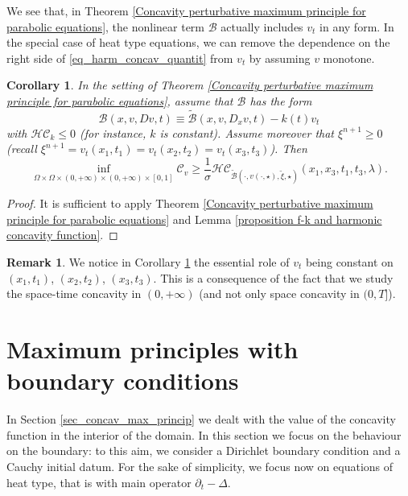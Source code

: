 \documentclass[11pt, reqno]{amsart}
\newtheorem{corollary}[lemma]{Corollary}
\theoremstyle{definition}
\newtheorem{remark}[lemma]{Remark}
\numberwithin{equation}{section}
\newcommand{\Btilde}{\widetilde{\mathscr{B}}}
\newcommand{\mc}[1]{\mathcal{#1}}
\begin{document}
We see that, in Theorem \ref{Concavity perturbative maximum principle for parabolic equations}, the nonlinear term $\mathscr{B}$ actually includes $v_t$ 
in any form. In the special case of heat type equations, we can remove the dependence on the right side of \eqref{eq_harm_concav_quantit} from $ v_t$ by assuming $v$ monotone.
\begin{corollary}\label{cor_discard_vt}
In the setting of Theorem \ref{Concavity perturbative maximum principle for parabolic equations}, assume that $\mathscr{B}$ has the form
$$\mathscr{B}(x, v, Dv, t) \equiv \Btilde(x,v, D_x v, t) - k(t) v_t$$
with $\mc{HC}_{k} \leq 0$ (for instance, $k$ is constant). 
Assume moreover that $\xi^{n+1} \geq 0$ (recall $\xi^{n+1}= v_t(x_1,t_1)= v_t(x_2,t_2)= v_t(x_3,t_3)$). Then
		\[ \inf_{\Omega\times \Omega \times (0,+\infty)\times (0,+\infty)\times[0,1]}\mathcal{C}_v\geq \dfrac{1}{\sigma} \mathcal{HC}_{\Btilde(\cdot, v(\cdot,\star), \tilde{\xi},\star)}(x_1,x_3,t_1,t_3,\lambda). \]
\end{corollary}
\begin{proof}
It is sufficient to apply Theorem \ref{Concavity perturbative maximum principle for parabolic equations} and Lemma \ref{proposition f-k and harmonic concavity function}.
\end{proof}

\begin{remark}
We notice in Corollary \ref{cor_discard_vt} the essential role of $ v_t$ being constant on $(x_1,t_1)$, $(x_2,t_2)$, $(x_3,t_3)$. This is a consequence of the fact that we study the space-time concavity in $(0,+\infty)$ (and not only space concavity in $(0,T]$).
\end{remark}


\section{Maximum principles with boundary conditions}
\label{sec_gen_eigen}

In Section \ref{sec_concav_max_princip} we dealt with the value of the concavity function in the interior of the domain. In this section we focus on the behaviour on the boundary: to this aim, we consider a Dirichlet boundary condition and a Cauchy initial datum. 
For the sake of simplicity, we focus now on equations of heat type, that is with main operator $\partial_t - \Delta$. 
\end{document}
